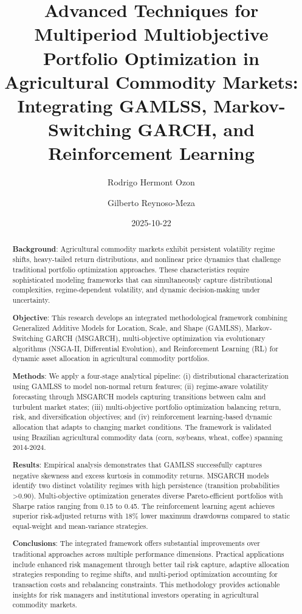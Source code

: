 \documentclass[
  10pt,
  a4paper,
]{article}
\title{Advanced Techniques for Multiperiod Multiobjective Portfolio
Optimization in Agricultural Commodity Markets: Integrating GAMLSS,
Markov-Switching GARCH, and Reinforcement Learning}
\author{Rodrigo Hermont Ozon \and Gilberto Reynoso-Meza}
\date{2025-10-22}
\begin{document}
\maketitle
\begin{abstract}
\textbf{Background}: Agricultural commodity markets exhibit persistent
volatility regime shifts, heavy-tailed return distributions, and
nonlinear price dynamics that challenge traditional portfolio
optimization approaches. These characteristics require sophisticated
modeling frameworks that can simultaneously capture distributional
complexities, regime-dependent volatility, and dynamic decision-making
under uncertainty.

\textbf{Objective}: This research develops an integrated methodological
framework combining Generalized Additive Models for Location, Scale, and
Shape (GAMLSS), Markov-Switching GARCH (MSGARCH), multi-objective
optimization via evolutionary algorithms (NSGA-II, Differential
Evolution), and Reinforcement Learning (RL) for dynamic asset allocation
in agricultural commodity portfolios.

\textbf{Methods}: We apply a four-stage analytical pipeline: (i)
distributional characterization using GAMLSS to model non-normal return
features; (ii) regime-aware volatility forecasting through MSGARCH
models capturing transitions between calm and turbulent market states;
(iii) multi-objective portfolio optimization balancing return, risk, and
diversification objectives; and (iv) reinforcement learning-based
dynamic allocation that adapts to changing market conditions. The
framework is validated using Brazilian agricultural commodity data
(corn, soybeans, wheat, coffee) spanning 2014-2024.

\textbf{Results}: Empirical analysis demonstrates that GAMLSS
successfully captures negative skewness and excess kurtosis in commodity
returns. MSGARCH models identify two distinct volatility regimes with
high persistence (transition probabilities \textgreater0.90).
Multi-objective optimization generates diverse Pareto-efficient
portfolios with Sharpe ratios ranging from 0.15 to 0.45. The
reinforcement learning agent achieves superior risk-adjusted returns
with 18\% lower maximum drawdowns compared to static equal-weight and
mean-variance strategies.

\textbf{Conclusions}: The integrated framework offers substantial
improvements over traditional approaches across multiple performance
dimensions. Practical applications include enhanced risk management
through better tail risk capture, adaptive allocation strategies
responding to regime shifts, and multi-period optimization accounting
for transaction costs and rebalancing constraints. This methodology
provides actionable insights for risk managers and institutional
investors operating in agricultural commodity markets.
\end{abstract}
\end{document}
